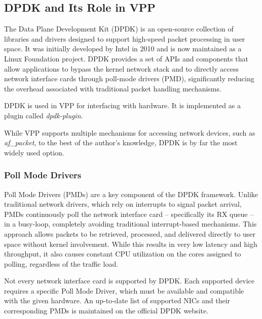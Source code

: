 \subsection{DPDK and Its Role in VPP}
The Data Plane Development Kit (DPDK) is an open-source collection of libraries and drivers designed to support high-speed packet processing in user space. 
It was initially developed by Intel in 2010 and is now maintained as a Linux Foundation project. 
DPDK provides a set of APIs and components that allow applications to bypass the kernel network stack and to directly access network interface cards 
through poll-mode drivers (PMD), significantly reducing the overhead associated with traditional packet handling mechanisms.~\cite{dpdk_about}

DPDK is used in VPP for interfacing with hardware. It is implemented as a plugin called \textit{dpdk-plugin}.~\cite{LINGUAGLOSSA, DR:COMMAG-18} 

While VPP supports multiple mechanisms for accessing network devices, such as \textit{af\_packet}, to the best of the author's knowledge, DPDK is by far the most widely used option.

\subsubsection{Poll Mode Drivers}
Poll Mode Drivers (PMDs) are a key component of the DPDK framework. Unlike traditional network drivers, which rely on interrupts to signal packet arrival, 
PMDs continuously poll the network interface card -- specifically its RX queue -- in a busy-loop, completely avoiding traditional interrupt-based mechanisms. 
This approach allows packets to be retrieved, processed, and delivered directly to user space without kernel involvement. 
While this results in very low latency and high throughput, it also causes constant CPU utilization on the cores assigned to polling, regardless of the traffic load.~\cite{FREITAS2022148}

Not every network interface card is supported by DPDK. Each supported device requires a specific Poll Mode Driver, which must be available and compatible with the given hardware. 
An up-to-date list of supported NICs and their corresponding PMDs is maintained on the official DPDK website.~\cite{dpdk-supported-nics}

